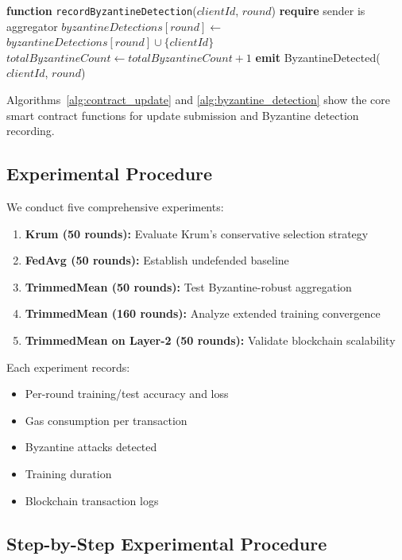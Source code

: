\documentclass[12pt,a4paper,onecolumn]{article}
\begin{document}
\begin{algorithm}[t]
\caption{Byzantine Detection and Recording}
\label{alg:byzantine_detection}
\begin{algorithmic}[1]
\STATE \textbf{function} \texttt{recordByzantineDetection}($clientId$, $round$)
\STATE \textbf{require} sender is aggregator
\STATE $byzantineDetections[round] \gets$ $byzantineDetections[round] \cup \{clientId\}$
\STATE $totalByzantineCount \gets totalByzantineCount + 1$
\STATE \textbf{emit} ByzantineDetected($clientId$, $round$)
\end{algorithmic}
\end{algorithm}

Algorithms~\ref{alg:contract_update} and \ref{alg:byzantine_detection} show the core smart contract functions for update submission and Byzantine detection recording.

\subsection{Experimental Procedure}

We conduct five comprehensive experiments:

\begin{enumerate}
    \item \textbf{Krum (50 rounds):} Evaluate Krum's conservative selection strategy
    \item \textbf{FedAvg (50 rounds):} Establish undefended baseline
    \item \textbf{TrimmedMean (50 rounds):} Test Byzantine-robust aggregation
    \item \textbf{TrimmedMean (160 rounds):} Analyze extended training convergence
    \item \textbf{TrimmedMean on Layer-2 (50 rounds):} Validate blockchain scalability
\end{enumerate}

Each experiment records:
\begin{itemize}
    \item Per-round training/test accuracy and loss
    \item Gas consumption per transaction
    \item Byzantine attacks detected
    \item Training duration
    \item Blockchain transaction logs
\end{itemize}

\subsection{Step-by-Step Experimental Procedure}
\label{sec:step_by_step}
\end{document}
